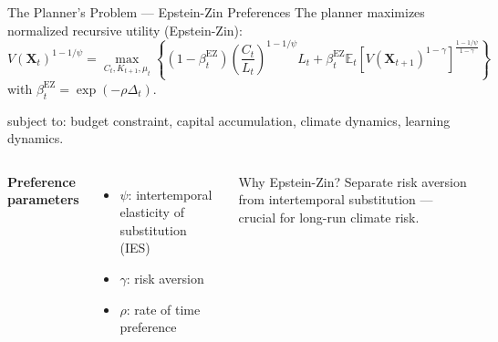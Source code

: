 \documentclass[aspectratio=169,11pt]{beamer}
\newcommand{\X}{\bm{X}}
\begin{document}
\begin{frame}{The Planner's Problem --- Epstein-Zin Preferences}
\small
The planner maximizes normalized recursive utility (Epstein-Zin):
\[
V(\X_t)^{1-1/\psi}
  = \max_{C_{t},K_{t+1},\mu_{t}}\left\{(1-\beta^{\mathrm{EZ}}_t)\left( \frac{C_{t}}{L_{t}} \right)^{1-1/\psi}L_{t}
    +
    \beta^{\mathrm{EZ}}_t \mathbb{E}_{t}\left[V(\X_{t+1})^{1-\gamma}\right]^{\frac{1-1/\psi}{1-\gamma}}\right\}
\]
with $\beta^{\mathrm{EZ}}_t=\exp(-\rho\Delta_t)$.

subject to: budget constraint, capital accumulation, climate dynamics, learning dynamics.

\vspace{0.2cm}
\begin{columns}[T]
\textbf{Preference parameters}
\begin{itemize}
    \item $\psi$: intertemporal elasticity of substitution (IES)
    \item $\gamma$: risk aversion
    \item $\rho$: rate of time preference
\end{itemize}

\begin{alertblock}{Why Epstein-Zin?}
Separate risk aversion from intertemporal substitution --- crucial for long-run climate risk.
\end{alertblock}
\end{columns}
\end{frame}
\end{document}
